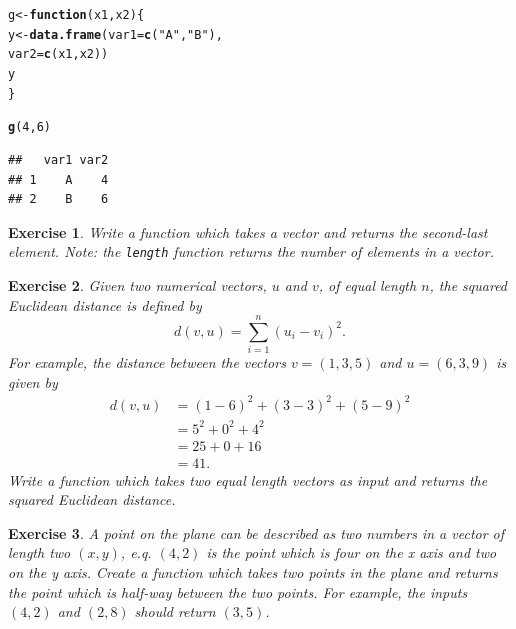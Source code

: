 \documentclass{article}\usepackage[]{graphicx}\usepackage[]{color}
\makeatletter
\newcommand{\hlnum}[1]{\textcolor[rgb]{0.686,0.059,0.569}{#1}}%
\newcommand{\hlstr}[1]{\textcolor[rgb]{0.192,0.494,0.8}{#1}}%
\newcommand{\hlstd}[1]{\textcolor[rgb]{0.345,0.345,0.345}{#1}}%
\newcommand{\hlkwa}[1]{\textcolor[rgb]{0.161,0.373,0.58}{\textbf{#1}}}%
\newcommand{\hlkwb}[1]{\textcolor[rgb]{0.69,0.353,0.396}{#1}}%
\newcommand{\hlkwc}[1]{\textcolor[rgb]{0.333,0.667,0.333}{#1}}%
\newcommand{\hlkwd}[1]{\textcolor[rgb]{0.737,0.353,0.396}{\textbf{#1}}}%
\newenvironment{kframe}{%
 \def\at@end@of@kframe{}%
 \ifinner\ifhmode%
  \def\at@end@of@kframe{\end{minipage}}%
  \begin{minipage}{\columnwidth}%
 \fi\fi%
 \def\FrameCommand##1{\hskip\@totalleftmargin \hskip-\fboxsep
 \colorbox{shadecolor}{##1}\hskip-\fboxsep
     \hskip-\linewidth \hskip-\@totalleftmargin \hskip\columnwidth}%
 \MakeFramed {\advance\hsize-\width
   \@totalleftmargin\z@ \linewidth\hsize
   \@setminipage}}%
 {\par\unskip\endMakeFramed%
 \at@end@of@kframe}
\newenvironment{knitrout}{}{} %
\newtheorem{exercise}{Exercise}[section]
\makeatother
\begin{document}
\begin{knitrout}
\color{fgcolor}\begin{kframe}
\begin{alltt}
\hlstd{g} \hlkwb{<-} \hlkwa{function}\hlstd{(}\hlkwc{x1}\hlstd{,} \hlkwc{x2}\hlstd{)\{}
  \hlstd{y} \hlkwb{<-} \hlkwd{data.frame}\hlstd{(}\hlkwc{var1} \hlstd{=} \hlkwd{c}\hlstd{(}\hlstr{"A"}\hlstd{,} \hlstr{"B"}\hlstd{),}
                  \hlkwc{var2} \hlstd{=} \hlkwd{c}\hlstd{(x1, x2))}
  \hlstd{y}
\hlstd{\}}

\hlkwd{g}\hlstd{(}\hlnum{4}\hlstd{,} \hlnum{6}\hlstd{)}
\end{alltt}
\begin{verbatim}
##   var1 var2
## 1    A    4
## 2    B    6
\end{verbatim}
\end{kframe}
\end{knitrout}

\begin{exercise}
Write a function which takes a vector and returns the second-last element. Note: the \texttt{length} function returns the number of elements in a vector.
\end{exercise}

\begin{exercise}
Given two numerical vectors, $u$ and $v$, of equal length $n$, the squared Euclidean distance is defined by
\begin{equation}
d(v,u)=\sum_{i=1}^n (u_i - v_i)^2.
\end{equation}
For example, the distance between the vectors $v = (1,3,5)$ and $u = (6,3,9)$ is given by
\begin{equation}
\begin{split}
d(v,u) &= (1-6)^2 + (3-3)^2 + (5-9)^2 \\
&= 5^2 + 0^2 + 4^2 \\ 
&= 25 + 0 + 16 \\
&= 41.
\end{split}
\end{equation}
Write a function which takes two equal length vectors as input and returns the squared Euclidean distance.
\end{exercise}

\begin{exercise} \label{halfFun}
A point on the plane can be described as two numbers in a vector of length two $(x,y)$, e.q. $(4,2)$ is the point which is four on the x axis and two on the y axis. Create a function which takes two points in the plane and returns the point which is half-way between the two points. For example, the inputs $(4,2)$ and $(2,8)$ should return $(3,5)$.
\end{exercise}
\end{document}
